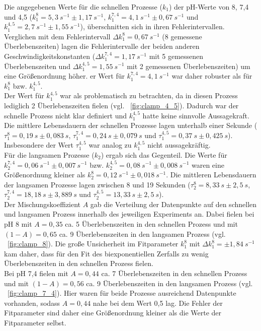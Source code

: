 Die angegebenen Werte für die schnellen Prozesse ($k_1$) der pH-Werte von 8, 7,4 und 4,5 ($k_1^8 = 5,3~s^{-1} \pm 1,17~s^{-1}$, $k_1^{7,4} = 4,1~s^{-1} \pm 0,67~s^{-1}$ und $k_1^{4,5} = 2,7~s^{-1} \pm 1,55~s^{-1}$), überschnitten sich in ihren Fehlerintervallen. Verglichen mit dem Fehlerintervall $\Delta k_1^8 = 0,67~s^{-1}$ (8 gemessene Überlebenszeiten) lagen die Fehlerintervalle der beiden anderen Geschwindigkeitskonstanten ($\Delta k_1^{7,4} = 1,17~s^{-1}$ mit 5 gemessenen Überlebenszeiten und $\Delta k_1^{4,5} = 1,55~s^{-1}$ mit 2 gemessenen Überlebenszeiten) um eine Größenordnung höher. er Wert für $k_1^{7,4} = 4,1~s^{-1}$ war daher robuster als für $k_1^8$ bzw. $k_1^{4,5}$.\\
Der Wert für $k_1^{4,5}$ war als problematisch zu betrachten, da in diesen Prozess lediglich 2 Überlebenszeiten fielen (vgl. \abb~\ref{fig:clamp_4_5}). Dadurch war der schnelle Prozess nicht klar definiert  und $k_1^{4,5}$ hatte keine sinnvolle Aussagekraft.\\
Die mittlere Lebensdauern der schnellen Prozesse lagen unterhalb einer Sekunde ($\tau_1^8 = 0,19~s \pm 0,083~s$, $\tau_1^{7,4} = 0,24~s \pm 0,079~s$ und $\tau_1^{4,5} = 0,37~s \pm 0,425~s$). Insbesondere der Wert $\tau_1^{4,5}$ war analog zu $k_1^{4,5}$ nicht aussagekräftig.\\
Für die langsamen Prozesse ($k_2$) ergab sich das Gegenteil. Die Werte für $k_2^{7,4} = 0,06~s^{-1} \pm 0,007~s^{-1}$ bzw. $k_2^{4,5} = 0,08~s^{-1} \pm 0,008~s^{-1}$ waren eine Größenordnung kleiner als $k_2^8 = 0,12~s^{-1} \pm 0,018~s^{-1}$. Die mittleren Lebensdauern der langsamen Prozesse lagen zwischen 8 und 19 Sekunden ($\tau_2^8 = 8,33~s \pm 2,5~s$, $\tau_2^{7,4} = 18,18~s \pm 3,889~s$ und $\tau_2^{4,5} = 13,33~s \pm 2,5~s$).\\
Der Mischungskoeffizient $A$ gab die Verteilung der Datenpunkte auf den schnellen und langsamen Prozess innerhalb des jeweiligen Experiments an. Dabei fielen bei pH 8 mit $A = 0,35$ ca. 5 Überlebenszeiten in den schnellen Prozess und mit $(1-A) = 0,65$ ca. 9 Überlebenszeiten in den langsamen Prozess (vgl. \abb~\ref{fig:clamp_8}). Die große Unsicherheit im Fitparameter $k_1^8$ mit $\Delta k_1^8 = \pm 1,84~s^{-1}$ kam daher, dass für den Fit des biexponentiellen Zerfalls zu wenig Überlebenszeiten in den schnellen Prozess fielen.\\
Bei pH 7,4 fielen mit $A = 0,44$ ca. 7 Überlebenszeiten in den schnellen Prozess und mit $(1-A) = 0,56$ ca. 9 Überlebenszeiten in den langsamen Prozess (vgl. \abb~\ref{fig:clamp_7_4}). Hier waren für beide Prozesse ausreichend Datenpunkte vorhanden, sodass $A = 0,44$ nahe bei dem Wert 0,5 lag. Die Fehler der Fitparameter sind daher eine Größenordnung kleiner als die Werte der Fitparameter selbst.\\
